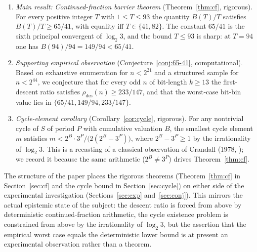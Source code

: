 \documentclass[11pt,a4paper]{article}
\theoremstyle{definition}
\theoremstyle{remark}
\begin{document}
\begin{enumerate}[label=(\roman*),leftmargin=2em]
  \item \emph{Main result: Continued-fraction barrier theorem}
    (Theorem~\ref{thm:cf}, rigorous).
    For every positive integer $T$ with $1 \leq T \leq 93$ the
    quantity $B(T)/T$ satisfies $B(T)/T \geq 65/41$, with equality
    iff $T \in \{41, 82\}$.  The constant $65/41$ is the sixth
    principal convergent of $\log_2 3$, and the bound $T \leq 93$ is
    sharp: at $T = 94$ one has $B(94)/94 = 149/94 < 65/41$.
  \item \emph{Supporting empirical observation}
    (Conjecture~\ref{conj:65-41}, computational).
    Based on exhaustive enumeration for $n < 2^{21}$ and a structured
    sample for $n < 2^{44}$, we conjecture that for every odd $n$ of
    bit-length $k \geq 13$ the first-descent ratio satisfies
    $\rho_{\mathrm{des}}(n) \geq 233/147$, and that the worst-case
    bit-bin value lies in $\{65/41, 149/94, 233/147\}$.
  \item \emph{Cycle-element corollary}
    (Corollary~\ref{cor:cycle}, rigorous).
    For any nontrivial cycle of $S$ of period $P$ with cumulative
    valuation $B$, the smallest cycle element $m$ satisfies
    $m < 2^B \cdot 3^P / \bigl(2 (2^B - 3^P)\bigr)$, where
    $2^B - 3^P \geq 1$ by the irrationality of $\log_2 3$.  This is
    a recasting of a classical observation of Crandall (1978,
    \cite[Eq.~(8)]{Crandall1978}); we record it because the same
    arithmetic ($2^B \neq 3^P$) drives Theorem~\ref{thm:cf}.
\end{enumerate}

The structure of the paper places the rigorous theorems
(Theorem~\ref{thm:cf} in Section~\ref{sec:cf} and the cycle bound in
Section~\ref{sec:cycle}) on either side of the experimental
investigation (Sections~\ref{sec:exp} and~\ref{sec:conj}).  This
mirrors the actual epistemic state of the subject: the descent ratio
is forced from above by deterministic continued-fraction arithmetic,
the cycle existence problem is constrained from above by the
irrationality of $\log_2 3$, but the assertion that the empirical
worst case equals the
deterministic lower bound is at present an experimental observation
rather than a theorem.
\end{document}
